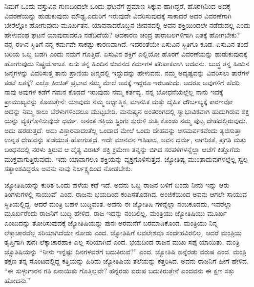 ನಿಮಗೆ ಒಂದು ವಸ್ತುವಿನ ಗುಣದಿಂದಲೇ ಒಂದು ಘಟನೆಗೆ ಪ್ರಮಾಣ ಸಿಕ್ಕುವ ಹಾಗಿದ್ದರೆ, ಹೊರಗಿನಿಂದ ಅದಕ್ಕೆ ವಿವರಣೆಯನ್ನು ಹುಡುಕುವುದು ಮೌಢ್ಯ.ಎದುರಿಗೆ ಇರುವುದೇ ವಿವರಿಸುವುದಕ್ಕೆ ಸಾಕಾದರೆ ಅದರ ವಿವರಣೆಗಾಗಿ ಬೇರೆಲ್ಲೋ ಹೋಗುವುದು ಮೂರ್ಖತನ. ಯಾವನಾದರೊಬ್ಬನ ಜೀವನದಲ್ಲಿ ಅವನ ಶಕ್ತಿಯಿಂದಲೇ ನಡೆದುದಲ್ಲ ಎಂದು ಹೇಳುವಂಥ ಘಟನೆ ಯಾವುದಾದರೂ ನಡೆದಿದೆಯೆ? ಆದಕಾರಣ ಚಂದ್ರ ತಾರಾಬಲಗಳಿಗಾಗಿ ಏತಕ್ಕೆ ಹೋಗಬೇಕು? ನನ್ನ ಈಗಿನ ಸ್ಥಿತಿಗೆ ನನ್ನ ಕರ್ಮವೇ ಸಾಕಷ್ಟು ಕಾರಣವಾಗಿದೆ. ಇದರಂತೆಯೇ ಏಸುವಿನ ಸ್ಥಿತಿಗೂ ಕೂಡ. ಏಸುವಿನ ತಂದೆ ಬರಿಯ ಒಬ್ಬ ಬಡಗಿ ಎಂದು ನಮಗೆ ಗೊತ್ತಿದೆ. ಏಸುವಿನ ಶಕ್ತಿಗೆ ಎಲ್ಲಿಯೋ ಹೊರಗೆ ವಿವರಣೆಯನ್ನು ಹುಡುಕುವುದಕ್ಕೆ ಹೋಗುವುದು ನಿಷ್ಪ್ರಯೋಜಕ. ಏಸು ತನ್ನ ಹಿಂದಿನ ಜೀವನದ ಕರ್ಮಗಳ ಪರಿಪಾಕವಾಗಿ ಆದವನು. ಬುದ್ಧ ತನ್ನ ಹಿಂದಿನ ಜನ್ಮಗಳನ್ನು ವಿವರಿಸುತ್ತ ತಾನು ಪ್ರಾಣಿಯ ಜನ್ಮದಲ್ಲಿ ಇದ್ದುದನ್ನು ಹೇಳುವನು. ನಮ್ಮ ಅದೃಷ್ಟವನ್ನು ವಿವರಿಸಲು ತಾರೆಗಳ ತಂಟೆ ಏತಕ್ಕೆ? ಎಲ್ಲೊ ಕಿಂಚಿತ್​ ಪ್ರಭಾವ ನಮ್ಮ ಮೇಲೆ ಅವಕ್ಕೆ ಇದ್ದರೂ ಇರಬಹುದು. ಆದರೂ ಅವುಗಳಿಗೆ ಹೆದರಿ ನಾವು ಅವುಗಳ ಕಡೆಗೆ ಗಮನ ಕೊಡದೆ ಇರುವುದು ನಮ್ಮ ಕರ್ತವ್ಯ. ನನ್ನ ಬೋಧನೆಯಲ್ಲೆಲ್ಲ ನಾನು ಇದಕ್ಕೆ ಪ್ರಾಮುಖ್ಯವನ್ನು ಕೊಡುತ್ತೇನೆ: ಯಾವುದು ನಮ್ಮ ಆಧ್ಯಾತ್ಮಿಕ, ಮಾನಸಿಕ ಮತ್ತು ದೈಹಿಕ ದೌರ್ಬಲ್ಯಕ್ಕೆ ಕಾರಣವೋ ಅದನ್ನು ನಿಮ್ಮ ಕಾಲು ಬೆರಳುಗಳಿಂದಲೂ ಮುಟ್ಟಬೇಡಿ. ಮನುಷ್ಯನ ಅಂತರಂಗದಲ್ಲಿ ಸ್ವಾಭಾವಿಕವಾಗಿ ಹುದುಗಿರುವ ಶಕ್ತಿ ಯನ್ನು ವ್ಯಕ್ತಗೊಳಿಸುವುದೇ ಧರ್ಮ. ಅನಂತ ಶಕ್ತಿಯ ಸ್ಪ್ರಿಂಗು ಸುರುಳಿ ಸುತ್ತಿ ಕೊಂಡು ನಮ್ಮ ಪುಟ್ಟ ದೇಹದಲ್ಲಿರುವುದು. ಅದು ಹರಡುತ್ತದೆ. ಅದು ವಿಸ್ತಾರವಾದಂತೆಲ್ಲ ಒಂದಾದ ಮೇಲೆ ಒಂದು ದೇಹವನ್ನು ಅಸಮರ್ಪಕವೆಂದು ತ್ಯಜಿಸುತ್ತಾ ಉನ್ನತ ದೇಹವನ್ನು ಪಡೆಯುತ್ತ ಹೋಗುತ್ತದೆ. ಇದೇ ಮಾನವನ ಇತಿಹಾಸ, ಅವನ ಧರ್ಮ, ನಾಗರಿಕತೆ, ಪ್ರಗತಿ ಮತ್ತು ಬಂಧನದಲ್ಲಿ ನರಳು ತ್ತಿರುವ ಆ ದೈತ್ಯ ವಿರಾಟ್​ ಶಕ್ತಿ ಕ್ರಮೇಣ ತನ್ನನ್ನು ಬಿಗಿದ ಸರಪಳಿಗಳನ್ನೆಲ್ಲಾ ಆಚೆಗೆ ಕಿತ್ತೊಗೆದು ಮುಕ್ತವಾಗುತ್ತಿರುವುದು. ಇದು ಯಾವಾಗಲೂ ಶಕ್ತಿಯನ್ನು ವ್ಯಕ್ತಗೊಳಿಸುತ್ತದೆ. ಜ್ಯೋತಿಷ್ಯ ಮುಂತಾದುವುಗಳಲ್ಲೆಲ್ಲ ಸ್ವಲ್ಪ ಸತ್ಯಾಂಶವಿದ್ದರೂ ಅವನು ನಾವು ನಿರ್ಲಕ್ಷ್ಯದಿಂದ ನೋಡಬೇಕು.

ಜ್ಯೋತಿಷಿಯನ್ನು ಕುರಿತ ಒಂದು ಹಳೆಯ ಕಥೆ ಇದೆ. ಅವನು ಒಬ್ಬ ರಾಜನ ಬಳಿಗೆ ಬಂದು ನೀನು ಇನ್ನು ಆರು ತಿಂಗಳುಗಳಲ್ಲಿ ಸಾಯುವೆ’ ಎಂದ. ರಾಜನು ಭಯದಿಂದ ಕಂಪಿಸತೊಡಗಿದ. ಅಂಜಿಕೆಯಿಂದ ಅವನು ಆಗಲೇ ಸಾಯುವ ಸ್ಥಿತಿಯಲ್ಲಿದ್ದ. ಆದರೆ ಮಂತ್ರಿ ಬಹಳ ಬುದ್ಧಿವಂತ. ಅವನು ಈ ಜ್ಯೋತಿಷಿ ಗಳನ್ನೆಲ್ಲಾ ನಂಬಕೂಡದು, ಇವರೆಲ್ಲಾ ಮೂರ್ಖರೆಂದು ರಾಜನಿಗೆ ಬುದ್ಧಿ ಹೇಳಿದ. ರಾಜ ಇದನ್ನು ನಂಬಲಿಲ್ಲ. ಮಂತ್ರಿಯು ಜ್ಯೋತಿಷಿಯು ಮೂರ್ಖ ಎಂಬುದನ್ನು ತೋರಿಸುವುದಕ್ಕೆ ಜ್ಯೋತಿಷಿಯನ್ನು ಪುನಃ ಅರಮನೆಗೆ ಬರಮಾಡಿಕೊಂಡ. ಮಂತ್ರಿಯು ನಿನ್ನ ಲೆಕ್ಕಾಚಾರವೆಲ್ಲ ಸರಿಯಾಗಿದೆಯೇ ನೋಡು ಎಂದ. ಜ್ಯೋತಿಷಿಗೆ ಲವಲೇಶವೂ ಸಂದೇಹವಿರಲಿಲ್ಲ. ಆದರೆ ಮಂತ್ರಿಯ ತೃಪ್ತಿಗಾಗಿ ಪುನಃ ಲೆಕ್ಕಾಚಾರಹಾಕಿ ಎಲ್ಲ ಸರಿಯಾಗಿದೆ ಎಂದ. ಭಯದಿಂದ ರಾಜನ ಮುಖ ಸಪ್ಪೆ ಯಾಯಿತು. ಮಂತ್ರಿ ಜ್ಯೊತಿಷಿಯನ್ನು “ನೀನು ಇನ್ನೆಷ್ಟು ದಿನಗಳವರೆಗೆ ಬದುಕಿರುವೆ?” ಎಂದ. ಜ್ಯೋತಿಷಿ ಹನ್ನೆರಡು ವರುಷ ಎಂದ. ಮಂತ್ರಿ ತಕ್ಷಣ ತನ್ನ ಸೊಂಟದಲ್ಲಿದ್ದ ಕತ್ತಿಯನ್ನು ಹಿರಿದು ಜ್ಯೋತಿಷಿಯ ತಲೆಯನ್ನು ಕತ್ತರಿಸಿದ. ಅವನು ರಾಜನಿಗೆ ಹೀಗೆ ಹೇಳಿದ, “ಈ ಸುಳ್ಳುಗಾರನ ಗತಿ ಏನಾಯಿತು ಗೊತ್ತಿಲ್ಲವೇ? ಹನ್ನೆರಡು ವರುಷ ಬದುಕಿರುತ್ತೇನೆ ಎಂದವನು ಈ ಕ್ಷಣ ಸತ್ತು ಹೋದನು.”

